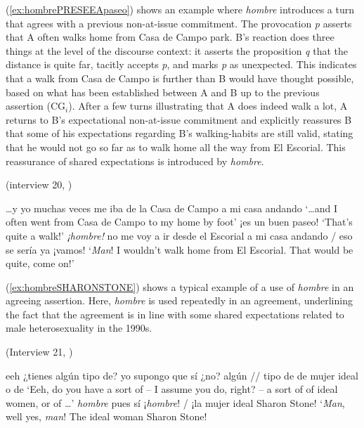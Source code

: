 (\ref{ex:hombrePRESEEApaseo}) shows an example where \textit{hombre} introduces a turn that agrees with a previous non-at-issue commitment. The provocation \textit{p} asserts that A often walks home from Casa de Campo park. B's reaction does three things at the level of the discourse context: it asserts the proposition \textit{q} that the distance is quite far, tacitly accepts \textit{p}, and marks \textit{p} as unexpected. This indicates that a walk from Casa de Campo is further than B would have thought possible, based on what has been established between A and B up to the previous assertion (CG$_i$). After a few turns illustrating that A does indeed walk a lot, A returns to B's expectational non-at-issue commitment and explicitly reassures B that some of his expectations regarding B's walking-habits are still valid, stating that he would not go so far as to walk home all the way from El Escorial. This reassurance of shared expectations is introduced by \textit{hombre}.


\begin{exe} 
	\ex \label{ex:hombrePRESEEApaseo}(interview 20, \cite{PRESEEA.20142020})
	\begin{xlist}[A:]
	 \ldots y yo muchas veces me iba de la Casa de Campo a mi casa andando 
	\glt `\ldots and I often went from Casa de Campo to my home by foot' 
	¡es un buen paseo! 
	\glt `That's quite a walk!' 
	\exi{}{\ldots }
	 \textit{¡hombre!} no me voy a ir desde el Escorial a mi casa andando  / eso se sería ya ¡vamos!
	\glt `\textit{Man}! I wouldn't walk home from El Escorial. That would be quite, come on!' 
	\end{xlist}
\end{exe}

(\ref{ex:hombreSHARONSTONE}) shows a typical example of a use of \textit{hombre} in an agreeing assertion. Here, \textit{hombre} is used repeatedly in an agreement, underlining the fact that the agreement is in line with some shared expectations related to male heterosexuality in the 1990s.

\begin{exe} 
	\ex \label{ex:hombreSHARONSTONE} (Interview 21, \cite{PRESEEA.20142020}) 
	\begin{xlist}[A:]
	 eeh ¿tienes algún tipo de? yo supongo que sí ¿no? algún // tipo de  de mujer ideal  o de 
	\glt `Eeh, do you have a sort of -- I assume you do, right? -- a sort of of ideal women, or of \ldots' 
	 \textit{hombre}  pues sí ¡\textit{hombre}! / ¡la mujer ideal Sharon Stone! 
	\glt `\textit{Man}, well yes, \textit{man}! The ideal woman Sharon Stone!
	\end{xlist}
\end{exe}



